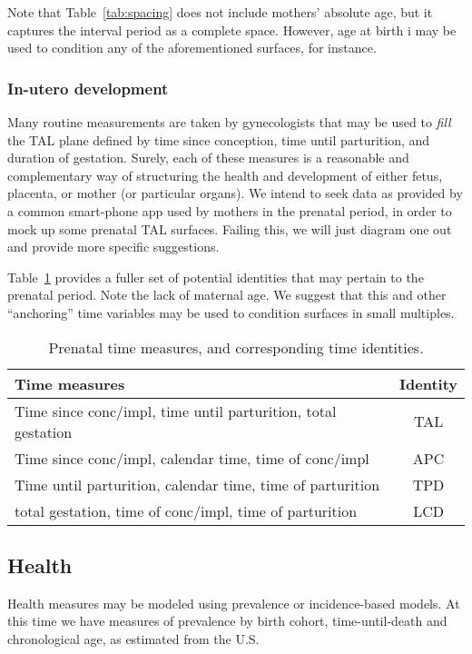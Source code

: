 \documentclass[11pt,oneside]{article} %
\begin{document}
		Note that Table~\ref{tab:spacing} does not include mothers' absolute age, but
		it captures the interval period as a complete space. However, age at birth i
		may be used to condition any of the aforementioned surfaces, for instance.
		
		\subsubsection{In-utero development}
		
		Many routine measurements are taken by gynecologists that may be used to
		\textit{fill} the TAL plane defined by time since conception, time until
		parturition, and duration of gestation. Surely, each of these measures is a reasonable and
		complementary way of structuring the health and development of either fetus,
		placenta, or mother (or particular organs). We intend to seek data as provided
		by a common smart-phone app used by mothers in the prenatal period, in order
		to mock up some prenatal TAL surfaces. Failing this, we will just diagram one
		out and provide more specific suggestions. 
		
		Table~\ref{tab:prenat} provides a fuller set of potential identities that may
		pertain to the prenatal period. Note the lack of maternal age.
		We suggest that this and other ``anchoring'' time variables may be used to
		condition surfaces in small multiples.
		
		\begin{table}[h!]
		\caption{Prenatal time measures, and corresponding time identities.}
	    \label{tab:prenat}
		\begin{tabular}{lc}
		Time measures & Identity \\ \hline
		Time since conc/impl, time until parturition, total gestation & TAL\\
		Time since conc/impl, calendar time, time of conc/impl & APC\\
		Time until parturition, calendar time, time of parturition & TPD\\
		total gestation, time of conc/impl, time of parturition & LCD
		\end{tabular}
		\end{table}
		
		
	\subsection{Health}
		
		Health measures may be modeled using prevalence or incidence-based models. At
		this time we have measures of prevalence by birth cohort, time-until-death and
		chronological age, as estimated from the U.S. \citet{HRS}
		
\end{document}
